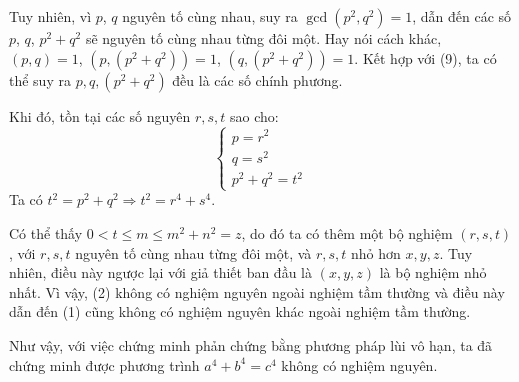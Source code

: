 Tuy nhiên, vì $p$, $q$ nguyên tố cùng nhau, suy ra $\gcd (p^2, q^2) = 1$, dẫn đến các số $p$, $q$, $p^2 + q^2$ sẽ nguyên tố cùng nhau từng đôi một. Hay nói cách khác, $(p, q) = 1$, $(p, (p^2 + q^2)) = 1$, $(q, (p^2 + q^2)) = 1$. Kết hợp với (9), ta có thể suy ra $p, q, (p^2 + q^2)$ đều là các số chính phương.

Khi đó, tồn tại các số nguyên $r, s, t$ sao cho:
$$ \begin{cases}
        p = r^2\\
        q = s^2\\
        p^2 + q^2 = t^2
\end{cases} $$
Ta có $t^2 = p^2 + q^2 \Rightarrow t^2 = r^4 + s^4$.

Có thể thấy $0 < t \leq m \leq m^2 + n^2 = z$, do đó ta có thêm một bộ nghiệm $(r, s, t)$, với $r, s, t$ nguyên tố cùng nhau từng đôi một, và $r, s, t$ nhỏ hơn $x, y, z$. Tuy nhiên, điều này ngược lại với giả thiết ban đầu là $(x, y, z)$ là bộ nghiệm nhỏ nhất. Vì vậy, (2) không có nghiệm nguyên ngoài nghiệm tầm thường và điều này dẫn đến (1) cũng không có nghiệm nguyên khác ngoài nghiệm tầm thường.

Như vậy, với việc chứng minh phản chứng bằng phương pháp lùi vô hạn, ta đã chứng minh được phương trình $a^4 + b^4 = c^4$ không có nghiệm nguyên.
\clearpage